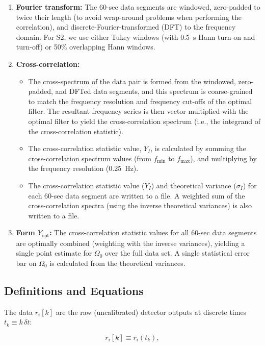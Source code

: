 \begin{enumerate}
\item \textbf{Fourier transform:}
The 60-sec data segments are windowed, zero-padded to twice their length
(to avoid wrap-around problems when performing the correlation), and
discrete-Fourier-transformed (DFT) to the frequency domain. For S2, we
use either Tukey windows (with 0.5~s Hann turn-on and turn-off) or 50\%
overlapping Hann windows.

\item \textbf{Cross-correlation:}
\begin{itemize}
\item The cross-spectrum of the data pair is formed from the windowed,
zero-padded, and DFTed data segments, and this spectrum is
coarse-grained to match the frequency resolution and frequency cut-offs
of the optimal filter. The resultant frequency series is then
vector-multiplied with the optimal filter to yield the cross-correlation
spectrum (i.e., the integrand of the cross-correlation statistic).
\item The cross-correlation statistic value, $Y_I$, is calculated by
summing the cross-correlation spectrum values (from $f_{\mathrm{min}}$ to
$f_{\mathrm{max}}$), and multiplying by the frequency resolution (0.25~Hz).
\item The cross-correlation statistic value ($Y_I$) and theoretical
variance ($\sigma_I$) for each 60-sec data segment are written to a
file. A weighted sum of the cross-correlation spectra (using the inverse
theoretical variances) is also written to a file.
\end{itemize}

\item \textbf{Form $Y_{\mathrm{opt}}$:}
The cross-correlation statistic values for all 60-sec data segments are
optimally combined (weighting with the inverse variances), yielding a
single point estimate for $\Omega_0$ over the full data set. A single
statistical error bar on $\Omega_0$ is calculated from the theoretical
variances.

\end{enumerate}

\subsection{Definitions and Equations}

The data $r_i[k]$ are the raw (uncalibrated) detector outputs at
discrete times $t_k \equiv k \, \delta t$:

\begin{equation}
r_i[k] \equiv r_i(t_k),
\end{equation}

